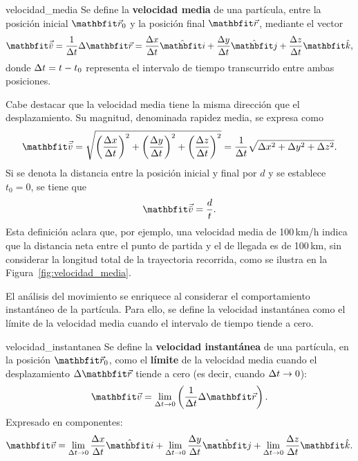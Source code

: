 \begin{definition}{}{velocidad_media}
    Se define la \textbf{velocidad media} de una partícula, entre la posición inicial $\vecr_0$ y la posición final $\vecr$, mediante el vector
    $$\velom = \frac{1}{\Deltat}\Deltar = \frac{\Deltax}{\Deltat}\veci + \frac{\Deltay}{\Deltat}\vecj + \frac{\Deltaz}{\Deltat}\veck,$$
    donde $\Delta t = t - t_0$ representa el intervalo de tiempo transcurrido entre ambas posiciones.
\end{definition}

Cabe destacar que la velocidad media tiene la misma dirección que el desplazamiento. Su magnitud, denominada rapidez media, se expresa como
$$\velom = \sqrt{\left(\frac{\Deltax}{\Deltat}\right)^2 + \left(\frac{\Deltay}{\Deltat}\right)^2 + \left(\frac{\Deltaz}{\Deltat}\right)^2} = \frac{1}{\Deltat}\sqrt{\Deltax^2 + \Deltay^2 + \Deltaz^2}.$$
Si se denota la distancia entre la posición inicial y final por $d$ y se establece $t_0 = 0$, se tiene que
$$\velom = \frac{d}{t}.$$
Esta definición aclara que, por ejemplo, una velocidad media de 100\,km/h indica que la distancia neta entre el punto de partida y el de llegada es de 100\,km, sin considerar la longitud total de la trayectoria recorrida, como se ilustra en la Figura~\ref{fig:velocidad_media}.

El análisis del movimiento se enriquece al considerar el comportamiento instantáneo de la partícula. Para ello, se define la velocidad instantánea como el límite de la velocidad media cuando el intervalo de tiempo tiende a cero.

\begin{definition}{}{velocidad_instantanea}
    Se define la \textbf{velocidad instantánea} de una partícula, en la posición $\vecr_0$, como el \textbf{límite} de la velocidad media cuando el desplazamiento $\Deltar$ tiende a cero (es decir, cuando $\Delta t \to 0$):
    $$\veloi = \lim_{\Deltat \to 0}\left(\frac{1}{\Deltat}\Deltar\right).$$
    Expresado en componentes:
    $$\veloi = \lim_{\Deltat \to 0}\frac{\Deltax}{\Deltat}\veci + \lim_{\Deltat \to 0}\frac{\Deltay}{\Deltat}\vecj + \lim_{\Deltat \to 0}\frac{\Deltaz}{\Deltat}\veck.$$
\end{definition}

